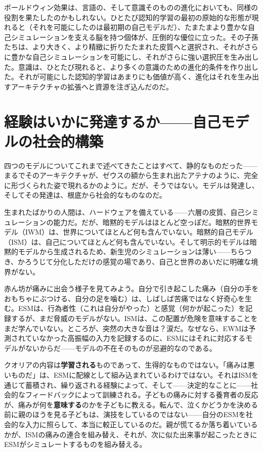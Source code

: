 \documentclass[11pt, twoside, openright]{book}
\begin{document}
ボールドウィン効果は、言語の、そして意識そのものの進化においても、同様の役割を果たしたのかもしれない。ひとたび認知的学習の最初の原始的な形態が現れると（それを可能にしたのは最初期の自己モデルだ）、たまたまより豊かな自己シミュレーションを支える脳を持つ個体が、圧倒的な優位に立った。その子孫たちは、より大きく、より精緻に折りたたまれた皮質へと選択され、それがさらに豊かな自己シミュレーションを可能にし、それがさらに強い選択圧を生み出した。意識は、ひとたび現れると、より多くの意識のための進化的条件を作り出した。それが可能にした認知的学習はあまりにも価値が高く、進化はそれを生み出すアーキテクチャの拡張へと資源を注ぎ込んだのだ。

\section*{経験はいかに発達するか------自己モデルの社会的構築}

四つのモデルについてこれまで述べてきたことはすべて、静的なものだった------まるでそのアーキテクチャが、ゼウスの額から生まれ出たアテナのように、完全に形づくられた姿で現れるかのように。だが、そうではない。モデルは発達し、そしてその発達は、根底から社会的なものなのだ。

生まれたばかりの人間は、ハードウェアを備えている------六層の皮質、自己シミュレーションの能力だ。だが、暗黙的モデルはほとんど空っぽだ。暗黙的世界モデル（IWM）は、世界についてほとんど何も含んでいない。暗黙的自己モデル（ISM）は、自己についてほとんど何も含んでいない。そして明示的モデルは暗黙的モデルから生成されるため、新生児のシミュレーションは薄い------ちらつき、かろうじて分化しただけの感覚の場であり、自己と世界のあいだに明確な境界がない。

赤ん坊が痛みに出会う様子を見てみよう。自分で引き起こした痛み（自分の手をおもちゃにぶつける、自分の足を噛む）は、しばしば苦痛ではなく好奇心を生む。ESMは、行為者性（これは自分がやった）と感覚（何かが起こった）を記録するが、まだ脅威のモデルがない。ISMは、この配置が危険を意味することをまだ学んでいない。ところが、突然の大きな音は？涙だ。なぜなら、EWMは予測されていなかった高振幅の入力を記録するのに、ESMにはそれに対応するモデルがないからだ------モデルの不在そのものが忌避的なのである。

クオリアの内容は\textbf{学習される}ものであって、生得的なものではない。「痛みは悪いものだ」は、ESMに配線として組み込まれているわけではない。それはISMを通じて蓄積され、繰り返される経験によって、そして------決定的なことに------社会的なフィードバックによって訓練される。子どもの痛みに対する養育者の反応が、痛みが何を\textbf{意味する}のかを子どもに教える。転んで、泣くかどうかを決める前に親のほうを見る子どもは、演技をしているのではない------自分のESMを社会的な入力に照らして、本当に較正しているのだ。親が慌てるか落ち着いているかが、ISMの痛みの連合を組み替え、それが、次に似た出来事が起こったときにESMがシミュレートするものを組み替える。
\end{document}

